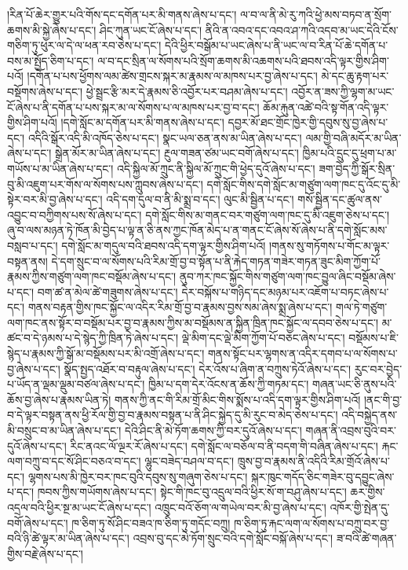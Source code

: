 །རིན་པོ་ཆེར་གྱུར་པའི་གོས་དང་དགོན་པར་མི་གནས་ཞེས་པ་དང་། ལ་བ་ལ་ནི་མེ་རུ་ཀའི་ཕྱེ་མས་བཏབ་ན་སྲོག་ཆགས་མི་སྐྱེ་ཞེས་པ་དང་། ཤིང་ཀུན་ཡང་ངོ་ཞེས་པ་དང་། ནིའི་ན་འབའ་དང་འབའ་ཤ་ཀའི་འདབ་མ་ཡང་དེའི་ངོས་གཅིག་ཏུ་ཕུར་ལ་དེ་ལ་ཕན་རབ་ཅེས་པ་དང་། དེའི་ཕྱིར་བསྒོམ་པ་ཡང་ཞེས་པ་ནི་ཡང་ལ་བ་རིན་པོ་ཆེ་དགོན་པ་བས་མ་སྤྱོད་ཅིག་པ་དང་། ལ་བ་དང་སྲིན་ལ་སོགས་པའི་སྲོག་ཆགས་མི་འཆགས་པའི་ཐབས་འདི་ལྟར་གྱིས་ཤིག་པའོ། །དགོན་པ་པས་ཕྱོགས་ལམ་ཚེས་གྲངས་སྐར་མ་རྣམས་ལ་མཁས་པར་བྱ་ཞེས་པ་དང་། མེ་དང་ཆུ་རྟག་པར་བསྡོགས་ཞེས་པ་དང་། ཕྱེ་སྦྲང་རྩི་མར་དེ་རྣམས་ཅི་འབྱོར་པར་བཤམ་ཞེས་པ་དང་། འབྱོར་ན་ཟས་ཀྱི་ལྷག་མ་ཡང་ངོ་ཞེས་པ་ནི་དགོན་པ་པས་སྐར་མ་ལ་སོགས་པ་ལ་མཁས་པར་བྱ་བ་དང་། ཆོམ་རྐུན་འཚེ་བའི་སྟ་གོན་འདི་ལྟར་གྱིས་ཤིག་པའོ། །དགེ་སློང་མ་དགོན་པར་མི་གནས་ཞེས་པ་དང་། དབྱར་མོ་ཐང་གྲོང་ཁྱེར་གྱི་དབུས་སུ་བྱ་ཞེས་པ་དང་། འདིའི་སྒོར་འདི་མི་འཁོད་ཅེས་པ་དང་། སྣང་ཡལ་ཅན་ནས་མ་ཡིན་ཞེས་པ་དང་། ལམ་གྱི་བཞི་མདོར་མ་ཡིན་ཞེས་པ་དང་། སྒྲེན་མོར་མ་ཡིན་ཞེས་པ་དང་། རྔུལ་གཟན་ཙམ་ཡང་བགོ་ཞེས་པ་དང་། ཁྱིམ་པའི་དྲུང་དུ་ཕྲག་པ་མ་གཡོས་པ་མ་ཡིན་ཞེས་པ་དང་། འདི་སྐྱིལ་མོ་ཀྲུང་ནི་སྐྱིལ་མོ་ཀྲུང་གི་ཕྱེད་དུའོ་ཞེས་པ་དང་། ཟག་བྱེད་ཀྱི་སྒོར་སྲིན་བུ་མི་འཇུག་པར་གོས་ལ་སོགས་པས་ཀླུབས་ཞེས་པ་དང་། དགེ་སློང་གིས་དགེ་སློང་མ་གཙུག་ལག་ཁང་དུ་འོང་དུ་མི་སྟེར་བར་མི་བྱ་ཞེས་པ་དང་། འདི་དག་དུལ་བ་ནི་མི་སྨྲ་བ་དང་། ལུང་མི་སྦྱིན་པ་དང་། གསོ་སྦྱིན་དང་ཚུལ་ནས་འབྱུང་བ་བཀྱིགས་པས་སོ་ཞེས་པ་དང་། དགེ་སློང་གིས་མ་གནང་བར་གཙུག་ལག་ཁང་དུ་མི་འཇུག་ཅེས་པ་དང་། ཞུ་བ་ལས་མཉན་ཏེ་ཁོན་མི་བྱེད་པ་ལྟ་ན་ཅི་ནས་ཀྱང་ཁོན་མེད་པ་ན་གནང་ངོ་ཞེས་སོ་ཞེས་པ་ནི་དགེ་སློང་མས་བསླབ་པ་དང་། དགེ་སློང་མ་གདུལ་བའི་ཐབས་འདི་དག་ལྟར་གྱིས་ཤིག་པའོ། །གནས་སུ་གཏོགས་པ་གོང་མ་ལྟར་བསྟན་ནས། དེ་དག་སྲུང་བ་ལ་སོགས་པའི་རིམ་གྲོ་བྱ་བ་སྟོན་པ་ནི་རྐེད་གཏན་གཟེར་གཏན་ཟུང་མིག་ཀྱོག་པོ་རྣམས་ཀྱིས་གཙུག་ལག་ཁང་བསྡོམ་ཞེས་པ་དང་། ནུབ་ཀར་ཁང་སྐྱོང་གིས་གཙུག་ལག་ཁང་བྱུལ་ཞིང་བསྡོམ་ཞེས་པ་དང་། བག་ཚ་ན་མེལ་ཚེ་གཟུགས་ཞེས་པ་དང་། དེར་བསྐོས་པ་གཉིད་དང་མཉམ་པར་འཇོག་པ་བཏང་ཞེས་པ་དང་། གནས་བརྟན་གྱིས་ཁང་སྐྱོང་ལ་འདིར་རིམ་གྲོ་བྱ་བ་རྣམས་བྱས་སམ་ཞེས་སྨྲ་ཞེས་པ་དང་། གལ་ཏེ་གཙུག་ལག་ཁང་ནས་སྟོར་བ་བསྡོམ་པར་བྱ་བ་རྣམས་ཀྱིས་མ་བསྡོམས་ན་སྐྱིན་ཁྲིན་ཁང་སྐྱོང་ལ་དབབ་ཅེས་པ་དང་། མ་ཚང་བ་དེ་ཉམས་པ་དེ་སྙེད་ཀྱི་ཁྲིན་ཏེ་ཞེས་པ་དང་། ལྡེ་མིག་དང་ལྡེ་མིག་ཀྱོག་པོ་བཅང་ཞེས་པ་དང་། བསྡོམས་པ་ཇི་སྙེད་པ་རྣམས་ཀྱི་སྒོ་མ་བསྡོམས་པར་མི་འགྲོ་ཞེས་པ་དང་། གནས་སྟོང་པར་ལྷགས་ན་འདིར་དགབ་པ་ལ་སོགས་པ་བྱ་ཞེས་པ་དང་། སྣོད་སྤྱད་འཐོར་བ་བརྟུལ་ཞེས་པ་དང་། དེར་འོས་པ་ཞིག་ན་བཀྲུས་ཏེའོ་ཞེས་པ་དང་། རུང་བར་བྱེད་པ་ཡོད་ན་ལྡམ་ལྡུམ་བཙལ་ཞེས་པ་དང་། ཁྱིམ་པ་དག་དེར་འོངས་ན་ཆོས་ཀྱི་གཏམ་དང་། གཞན་ཡང་ཅི་ནུས་པའི་ཆོས་བྱ་ཞེས་པ་རྣམས་ཡིན་ཏེ། གནས་ཀྱི་ནང་གི་རིམ་གྲོ་མིང་གིས་སྨོས་པ་འདི་དག་ལྟར་གྱིས་ཤིག་པའོ། །ནང་གི་བྱ་བ་དེ་ལྟར་བསྟན་ནས་ཕྱི་རོལ་གྱི་བྱ་བ་རྣམས་བསྟན་པ་ནི་ཤིང་སྐྱེད་དུ་མི་རུང་བ་མེད་ཅེས་པ་དང་། འདི་བསྐྱེད་ནས་མི་བསྲུང་བ་མ་ཡིན་ཞེས་པ་དང་། དེའི་ཤིང་ནི་མེ་ཏོག་ཆགས་ཀྱི་བར་དུའོ་ཞེས་པ་དང་། གཞན་ནི་འབྲས་བུའི་བར་དུའོ་ཞེས་པ་དང་། རིང་ནའང་ལོ་ལྔར་རོ་ཞེས་པ་དང་། དགེ་སློང་ལ་བཅོལ་བ་ནི་བདག་གི་བཞིན་ཞེས་པ་དང་། རྐང་ལག་བཀྲུ་བ་དང་སོ་ཤིང་བཅའ་བ་དང་། ལྷུང་བཟེད་བཤལ་བ་དང་། ཁྲུས་བྱ་བ་རྣམས་ནི་འདིའི་རིམ་གྲོའོ་ཞེས་པ་དང་། ལྷགས་པས་མི་ཁྱེར་བར་ཁང་བུའི་དབུས་སུ་གཞུག་ཅེས་པ་དང་། སྐར་ཁུང་གདོད་ཅིང་གཟེར་བུ་དབྱུང་ཞེས་པ་དང་། ཁབས་ཀྱིས་གཡོགས་ཞེས་པ་དང་། སྟེང་གི་ཁང་བུ་འདྲུལ་བའི་ཕྱིར་སོ་ག་བཤུ་ཞེས་པ་དང་། ཆར་གྱིས་འདྲལ་བའི་ཕྱིར་སྔ་མ་ཡང་ངོ་ཞེས་པ་དང་། འཁྲུང་བའོ་ཅོག་ལ་གཡེལ་བར་མི་བྱ་ཞེས་པ་དང་། འཁོར་གྱི་སྤེན་དུ་བགོ་ཞེས་པ་དང་། ཁ་ཅིག་ཏུ་སོ་ཤིང་བཟའ་ཁ་ཅིག་ཏུ་གདོང་བཀྲུ། ཁ་ཅིག་ཏུ་རྐང་ལག་ལ་སོགས་པ་བཀྲུ་བར་བྱ་བའི་ཉི་ཚེ་ལྟར་མ་ཡིན་ཞེས་པ་དང་། འབྲས་བུ་དང་མེ་ཏོག་སྲུང་བའི་དགེ་སློང་བསྐོ་ཞེས་པ་དང་། ཟ་བའི་ཚེ་གཞན་གྱིས་བརྗེ་ཞེས་པ་དང་། 